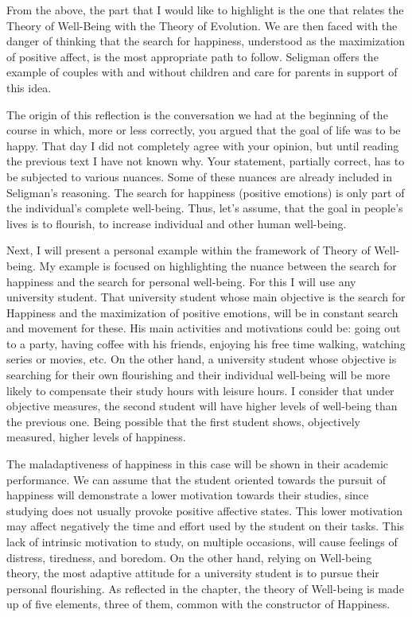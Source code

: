 \documentclass[]{book}
\begin{document}
From the above, the part that I would like to highlight is the one that relates the Theory of Well-Being with the Theory of Evolution. We are then faced with the danger of thinking that the search for happiness, understood as the maximization of positive affect, is the most appropriate path to follow. Seligman offers the example of couples with and without children and care for parents in support of this idea.

The origin of this reflection is the conversation we had at the beginning of the course in which, more or less correctly, you argued that the goal of life was to be happy. That day I did not completely agree with your opinion, but until reading the previous text I have not known why. Your statement, partially correct, has to be subjected to various nuances. Some of these nuances are already included in Seligman's reasoning. The search for happiness (positive emotions) is only part of the individual's complete well-being. Thus, let's assume, that the goal in people's lives is to flourish, to increase individual and other human well-being.

Next, I will present a personal example within the framework of Theory of Well-being. My example is focused on highlighting the nuance between the search for happiness and the search for personal well-being. For this I will use any university student. That university student whose main objective is the search for Happiness and the maximization of positive emotions, will be in constant search and movement for these. His main activities and motivations could be: going out to a party, having coffee with his friends, enjoying his free time walking, watching series or movies, etc. On the other hand, a university student whose objective is searching for their own flourishing and their individual well-being will be more likely to compensate their study hours with leisure hours. I consider that under objective measures, the second student will have higher levels of well-being than the previous one. Being possible that the first student shows, objectively measured, higher levels of happiness.

The maladaptiveness of happiness in this case will be shown in their academic performance. We can assume that the student oriented towards the pursuit of happiness will demonstrate a lower motivation towards their studies, since studying does not usually provoke positive affective states. This lower motivation may affect negatively the time and effort used by the student on their tasks. This lack of intrinsic motivation to study, on multiple occasions, will cause feelings of distress, tiredness, and boredom. On the other hand, relying on Well-being theory, the most adaptive attitude for a university student is to pursue their personal flourishing. As reflected in the chapter, the theory of Well-being is made up of five elements, three of them, common with the constructor of Happiness.
\end{document}
